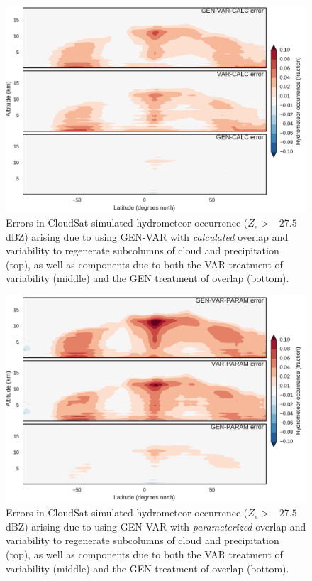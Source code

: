 \begin{figure}
\centering
\includegraphics[width=\columnwidth]{graphics/subgrid2_hfba_zonal_gen-var-calc_diff.pdf}
\caption{Errors in CloudSat-simulated hydrometeor occurrence ($Z_e > -27.5$ dBZ) arising due to using GEN-VAR with \emph{calculated} overlap and variability to regenerate subcolumns of cloud and precipitation (top), as well as components due to both the VAR treatment of variability (middle) and the GEN treatment of overlap (bottom).}
\label{subgrid2_hfba_zonal_diff}
\end{figure}

\begin{figure}
\centering
\includegraphics[width=\columnwidth]{graphics/subgrid2_hfba_zonal_gen-var-param_diff.pdf}
\caption{Errors in CloudSat-simulated hydrometeor occurrence ($Z_e > -27.5$ dBZ) arising due to using GEN-VAR with \emph{parameterized} overlap and variability to regenerate subcolumns of cloud and precipitation (top), as well as components due to both the VAR treatment of variability (middle) and the GEN treatment of overlap (bottom).}
\label{subgrid2_hfba_zonal_gen-var-param_diff}
\end{figure}

